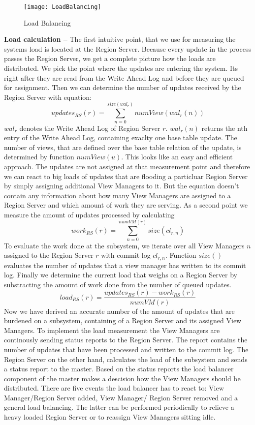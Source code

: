 \documentclass[11pt,a4paper,bibtotoc,idxtotoc,headsepline,footsepline,footexclude,BCOR12mm,DIV13]{scrbook}
\begin{document}
\begin{figure}[h!]
  
  \centering
    \texttt{[image: LoadBalancing]}
    \caption{Load Balancing}
    \label{fig:loadbalancing}
\end{figure}

\noindent  
\textbf{Load calculation -- }The first intuitive point, that we use for measuring the systems load is located at the Region Server. Because every update in the process passes the Region Server, we get a complete picture how the loads are distributed. We pick the point where the updates are entering the system. Its right after they are read from the Write Ahead Log and before they are queued for assignment. Then we can determine the number of updates received by the Region Server with equation:
\[updates_{RS}(r)=\sum_{n=0}^{size(wal_r)} numView({wal_r}(n))\]
$wal_r$ denotes the Write Ahead Log of Region Server $r$. ${wal_r}(n)$ returns the nth entry of the Write Ahead Log, containing exaclty one base table update. The number of views, that are defined over the base table relation of the update, is determined by function $numView(u)$. This looks like an easy and efficient approach. The updates are not assigned at that measurement point and therefore we can react to big loads of updates that are flooding a particluar Region Server by simply assigning additional View Managers to it. But the equation doesn't contain any information about how many View Managers are assigned to a Region Server and which amount of work they are serving. As a second point we measure the amount of updates processed by calculating 
\[work_{RS}(r)=\sum_{n=0}^{numVM(r)}size(cl_{r,n})\]
To evaluate the work done at the subsystem, we iterate over all View Managers $n$ assigned to the Region Server $r$ with commit log $cl_{r,n}$. Function $size()$ evaluates the number of updates that a view manager has written to its commit log. Finally we determine the current load that weighs on a Region Server by substracting the amount of work done from the number of queued updates.  
\[load_{RS}(r)=\frac{updates_{RS}(r)- work_{RS}(r)}{numVM(r)}\]
Now we have derived an accurate number of the amount of updates that are burdened on a subsystem, containing of a Region Server and its assigned View Managers. To implement the load measurement the View Managers are continously sending status reports to the Region Server. The report contains the number of updates that have been processed and written to the commit log. The Region Server on the other hand, calculates the load of the subsystem and sends a status report to the master. Based on the status reports the load balancer component of the master makes a descision how the View Managers should be distributed. There are five events the load balancer has to react to: View Manager/Region Server added, View Manager/ Region Server removed and a general load balancing. The latter can be performed periodically to relieve a heavy loaded Region Server or to reassign View Managers sitting idle.\\
\end{document}
